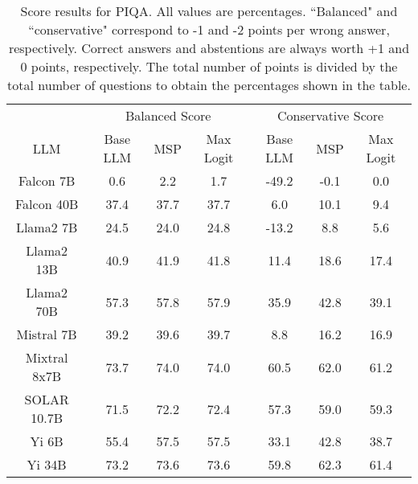 \begin{table*}
\centering
\begin{tabular}{c|c|c|c|c|c|c}
& \multicolumn{3}{c|}{Balanced Score} & \multicolumn{3}{c}{Conservative Score} \\ 
LLM & Base LLM & MSP & Max Logit & Base LLM & MSP & Max Logit\\ \hline
Falcon 7B & 0.6 & 2.2 & 1.7 & -49.2 & -0.1 & 0.0\\
Falcon 40B & 37.4 & 37.7 & 37.7 & 6.0 & 10.1 & 9.4\\
Llama2 7B & 24.5 & 24.0 & 24.8 & -13.2 & 8.8 & 5.6\\
Llama2 13B & 40.9 & 41.9 & 41.8 & 11.4 & 18.6 & 17.4\\
Llama2 70B & 57.3 & 57.8 & 57.9 & 35.9 & 42.8 & 39.1\\
Mistral 7B & 39.2 & 39.6 & 39.7 & 8.8 & 16.2 & 16.9\\
Mixtral 8x7B & 73.7 & 74.0 & 74.0 & 60.5 & 62.0 & 61.2\\
SOLAR 10.7B & 71.5 & 72.2 & 72.4 & 57.3 & 59.0 & 59.3\\
Yi 6B & 55.4 & 57.5 & 57.5 & 33.1 & 42.8 & 38.7\\
Yi 34B & 73.2 & 73.6 & 73.6 & 59.8 & 62.3 & 61.4\\
\hline
\end{tabular}
\caption{Score results for PIQA. All values are percentages. ``Balanced" and ``conservative" correspond to -1 and -2 points per wrong answer, respectively. Correct answers and abstentions are always worth +1 and 0 points, respectively. The total number of points is divided by the total number of questions to obtain the percentages shown in the table.}
\label{tab:piqa_score}
\end{table*}
